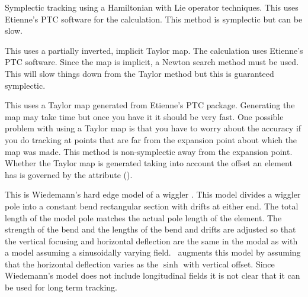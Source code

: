 \begin{description}
\item[\vn{Symp_Lie_PTC}]
Symplectic tracking using a Hamiltonian with Lie operator techniques.
This uses Etienne's PTC software for the calculation. This method is
symplectic but can be slow.

\item[\vn{Symp_Map}]
This uses a partially inverted, implicit Taylor map. The calculation
uses Etienne's PTC software.  Since the map is implicit, a Newton
search method must be used. This will slow things down from the Taylor
method but this is guaranteed symplectic.

\item[\vn{Taylor}]
This uses a Taylor map generated from Etienne's PTC
package. Generating the map may take time but once you have it it
should be very fast. One possible problem with using a Taylor map is
that you have to worry about the accuracy if you do tracking at points
that are far from the expansion point about which the map was
made. This method is non-symplectic away from the expansion
point. Whether the Taylor map is generated taking into account the
offset an element has is governed by the 
attribute ().

\item[\vn{Wiedemann}]
This is Wiedemann's hard edge model of a wiggler
\cite{wiedemann}. This model divides a wiggler pole into a constant 
bend rectangular section with drifts at either end. The total length
of the model pole matches the actual pole length of the element. The
strength of the bend and the lengths of the bend and drifts are
adjusted so that the vertical focusing and horizontal deflection are
the same in the modal as with a model assuming a sinusoidally varying
field. \bmad\ augments this model by assuming that the horizontal
deflection varies as the $\sinh$ with vertical offset.  Since
Wiedemann's model does not include longitudinal fields it is not clear
that it can be used for long term tracking.

\end{description}

\vfill \break
{\vfill}

